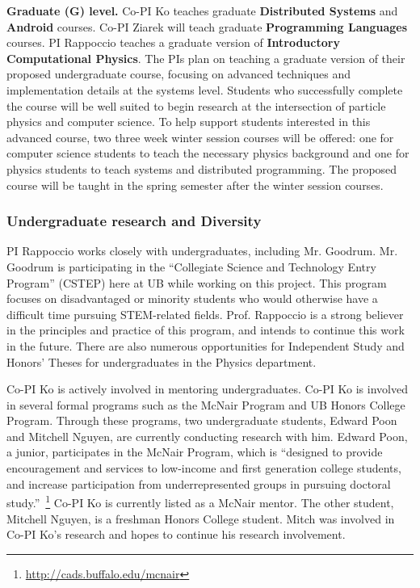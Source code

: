 \documentclass[times,11pt]{article}
\begin{document}
{\bf Graduate (G) level.}  
Co-PI Ko teaches graduate {\bf Distributed Systems} and {\bf Android} courses. Co-PI Ziarek will
teach graduate {\bf Programming Languages} courses. PI Rappoccio
teaches a graduate version of {\bf Introductory Computational Physics}. 
The PIs plan on teaching a graduate version
of their proposed undergraduate course, focusing on advanced techniques and implementation
details at the systems level.  Students who successfully complete the course will be well suited to
begin research at the intersection of particle physics and computer science. To help support
students interested in this advanced course, two three week winter session courses will be offered: 
one for computer science students to teach the necessary physics background and one for physics
students to teach systems and distributed programming.  The proposed course will be taught
in the spring semester after the winter session courses.

\subsubsection{Undergraduate research and Diversity}

PI Rappoccio works closely with
undergraduates, including Mr. Goodrum. Mr. Goodrum is participating in the
``Collegiate Science and Technology Entry Program'' (CSTEP) here at
UB while working on this project. This program focuses on
disadvantaged or minority students who would otherwise have a
difficult time pursuing STEM-related fields. Prof. Rappoccio is a
strong believer in the principles and practice of this program, and
intends to continue this work in the future. 
There are also numerous opportunities for Independent Study and
Honors' Theses for undergraduates in the Physics department. 

Co-PI Ko is actively involved in mentoring undergraduates. Co-PI Ko is involved
in several formal programs such as the McNair Program and UB Honors College
Program. Through these programs, two undergraduate students, Edward Poon and
Mitchell Nguyen, are currently conducting research with him. Edward Poon, a
junior, participates in the McNair Program, which is ``designed to provide
encouragement and services to low-income and first generation college students,
and increase participation from underrepresented groups in pursuing doctoral
study.''~\footnote{\url{http://cads.buffalo.edu/mcnair}} Co-PI Ko is currently
listed as a McNair mentor. The other student, Mitchell Nguyen, is a freshman
Honors College student. Mitch was involved in Co-PI Ko's research and
hopes to continue his research involvement.
\end{document}
